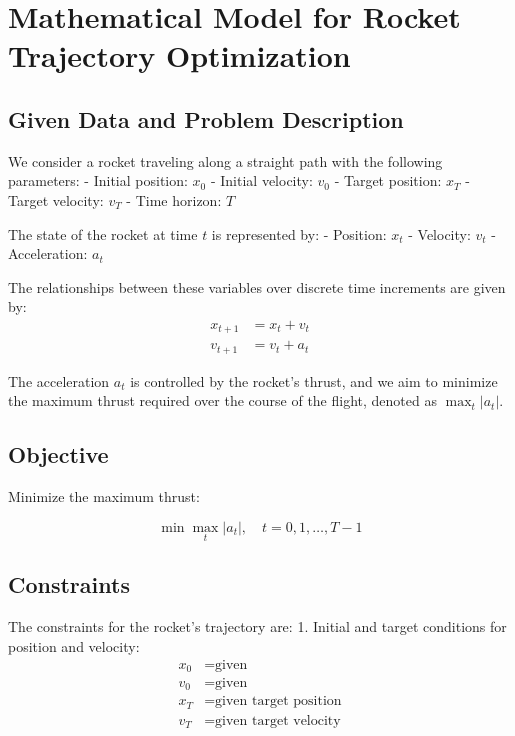 \documentclass{article}
\begin{document}
\section*{Mathematical Model for Rocket Trajectory Optimization}

\subsection*{Given Data and Problem Description}

We consider a rocket traveling along a straight path with the following parameters:
- Initial position: \( x_0 \)
- Initial velocity: \( v_0 \)
- Target position: \( x_T \)
- Target velocity: \( v_T \)
- Time horizon: \( T \)

The state of the rocket at time \( t \) is represented by:
- Position: \( x_t \)
- Velocity: \( v_t \)
- Acceleration: \( a_t \)

The relationships between these variables over discrete time increments are given by:
\begin{align*}
    x_{t+1} &= x_t + v_t \\
    v_{t+1} &= v_t + a_t
\end{align*}

The acceleration \( a_t \) is controlled by the rocket's thrust, and we aim to minimize the maximum thrust required over the course of the flight, denoted as \( \max_t |a_t| \).

\subsection*{Objective}

Minimize the maximum thrust:

\[
\min \max_t |a_t|, \quad t = 0, 1, \ldots, T-1
\]

\subsection*{Constraints}

The constraints for the rocket's trajectory are:
1. Initial and target conditions for position and velocity:
   \begin{align*}
       x_0 &= \text{given} \\
       v_0 &= \text{given} \\
       x_T &= \text{given target position} \\
       v_T &= \text{given target velocity}
   \end{align*}
\end{document}
